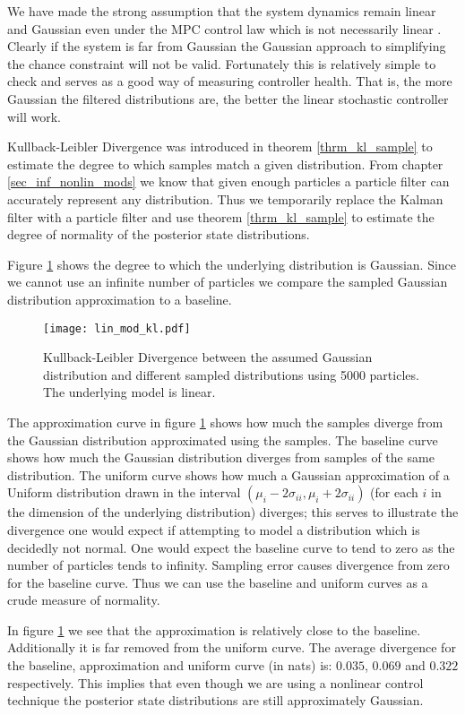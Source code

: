 We have made the strong assumption that the system dynamics remain linear and Gaussian even under the MPC control law which is not necessarily linear \cite{mac}. Clearly if the system is far from Gaussian the Gaussian approach to simplifying the chance constraint will not be valid. Fortunately this is relatively simple to check and serves as a good way of measuring controller health. That is, the more Gaussian the filtered distributions are, the better the linear stochastic controller will work. 

Kullback-Leibler Divergence was introduced in theorem \ref{thrm_kl_sample} to estimate the degree to which samples match a given distribution. From chapter \ref{sec_inf_nonlin_mods} we know that given enough particles a particle filter can accurately represent any distribution. Thus we temporarily replace the Kalman filter with a particle filter and use theorem \ref{thrm_kl_sample} to estimate the degree of normality of the posterior state distributions.

Figure \ref{fig_lin_mod_kl} shows the degree to which the underlying distribution is Gaussian. Since we cannot use an infinite number of particles we compare the sampled Gaussian distribution approximation to a baseline.   
\begin{figure}[H] 
\centering
\texttt{[image: lin\_mod\_kl.pdf]}
\caption{Kullback-Leibler Divergence between the assumed Gaussian distribution and different sampled distributions using 5000 particles. The underlying model is linear.}
\label{fig_lin_mod_kl}
\end{figure}
The approximation curve in figure \ref{fig_lin_mod_kl} shows how much the samples diverge from the Gaussian distribution approximated using the samples. The baseline curve shows how much the Gaussian distribution diverges from samples of the same distribution. The uniform curve shows how much a Gaussian approximation of a Uniform distribution drawn in the interval $(\mu_i-2\sigma_{ii}, \mu_i+2\sigma_{ii})$ (for each $i$ in the dimension of the underlying distribution) diverges; this serves to illustrate the divergence one would expect if attempting to model a distribution which is decidedly not normal. One would expect the baseline curve to tend to zero as the number of particles tends to infinity. Sampling error causes divergence from zero for the baseline curve. Thus we can use the baseline and uniform curves as a crude measure of normality.

In figure \ref{fig_lin_mod_kl} we see that the approximation is relatively close to the baseline. Additionally it is far removed from the uniform curve. The average divergence for the baseline, approximation and uniform curve (in nats) is: $0.035$, $0.069$ and $0.322$ respectively. This implies that even though we are using a nonlinear control technique the posterior state distributions are still approximately Gaussian. 

